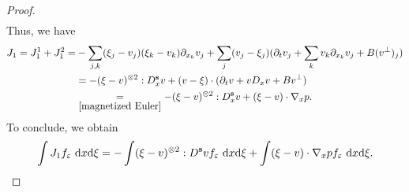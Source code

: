 \documentclass[11pt,reqno]{amsart}
\numberwithin{equation}{section}
\def\dd{{\rm d}}
\begin{document}
\begin{proof}
\begin{align}
\end{align}  
Thus,  we have
\begin{align*}
J_{1}=J_{1}^{1}+J^{2}_{1}=&
-\sum_{j,k}(\xi_{j}-v_{j})(\xi_{k}-v_{k})\partial_{x_{k}}v_{j}+\sum_{j}(v_{j}-\xi_{j})(\partial_{t}v_{j}+\sum_{k}v_{k}\partial_{x_{k}}v_{j}+B(v^{\perp})_{j})\\
&=-(\xi-v)^{\otimes 2}:D^{\mathbf{s}}_{x}v+(v-\xi)\cdot (\partial_{t}v+vD_{x}v+Bv^{\perp})\\
&\underset{\eqref{magnetized Euler}}{=}-(\xi-v)^{\otimes 2}:D^{\mathbf{s}}_{x}v+(\xi-v)\cdot \nabla_{x}p.
\end{align*}
To conclude, we obtain
\begin{align}
\int J_{1} f_{\varepsilon}\ \dd x\dd \xi= -\int (\xi-v)^{\otimes 2}:D^{\mathbf{s}}vf_{\varepsilon}\ \dd x\dd \xi+\int (\xi-v)\cdot \nabla_{x} p f_{\varepsilon}\ \dd x\dd \xi.   \label{J1 integral formula}
\end{align}


\end{proof}
\end{document}
